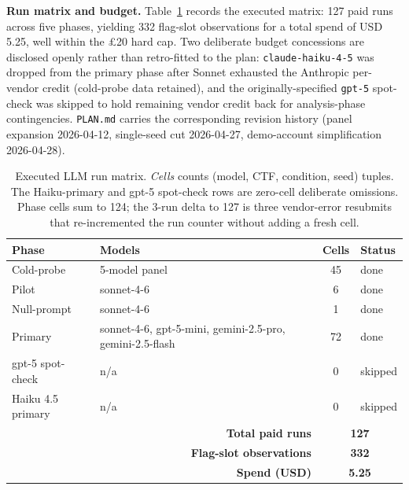 \textbf{Run matrix and budget.} Table~\ref{tab:llm-matrix}
records the executed matrix: 127 paid runs across five
phases, yielding 332 flag-slot observations for a total spend
of USD\,5.25, well within the \pounds20 hard cap. Two
deliberate budget concessions are disclosed openly rather
than retro-fitted to the plan: \texttt{claude-haiku-4-5}
was dropped from the primary phase after Sonnet exhausted
the Anthropic per-vendor credit (cold-probe data retained),
and the originally-specified \texttt{gpt-5} spot-check was
skipped to hold remaining vendor credit back for analysis-phase
contingencies. \texttt{PLAN.md} carries the corresponding
revision history (panel expansion 2026-04-12, single-seed cut
2026-04-27, demo-account simplification 2026-04-28).

\begin{table}[t]
\centering
\caption{Executed LLM run matrix. \textit{Cells} counts
(model, CTF, condition, seed) tuples. The Haiku-primary and
gpt-5 spot-check rows are zero-cell deliberate omissions.
Phase cells sum to 124; the 3-run delta to 127 is three
vendor-error resubmits that re-incremented the run counter
without adding a fresh cell.}
\label{tab:llm-matrix}
\scriptsize
\setlength{\tabcolsep}{3pt}
\renewcommand{\arraystretch}{1.08}
\begin{tabularx}{\columnwidth}{|p{1.35cm}|X|c|p{1.05cm}|}
\hline
\textbf{Phase} & \textbf{Models} & \textbf{Cells} & \textbf{Status} \\ \hline
Cold-probe & 5-model panel & 45 & done \\ \hline
Pilot & sonnet-4-6 & 6 & done \\ \hline
Null-prompt & sonnet-4-6 & 1 & done \\ \hline
Primary & sonnet-4-6, gpt-5-mini, gemini-2.5-pro, gemini-2.5-flash & 72 & done \\ \hline
gpt-5 spot-check & n/a & 0 & skipped \\ \hline
Haiku 4.5 primary & n/a & 0 & skipped \\ \hline
\multicolumn{2}{|r|}{\textbf{Total paid runs}} & \multicolumn{2}{c|}{\textbf{127}} \\ \hline
\multicolumn{2}{|r|}{\textbf{Flag-slot observations}} & \multicolumn{2}{c|}{\textbf{332}} \\ \hline
\multicolumn{2}{|r|}{\textbf{Spend (USD)}} & \multicolumn{2}{c|}{\textbf{5.25}} \\ \hline
\end{tabularx}
\end{table}

